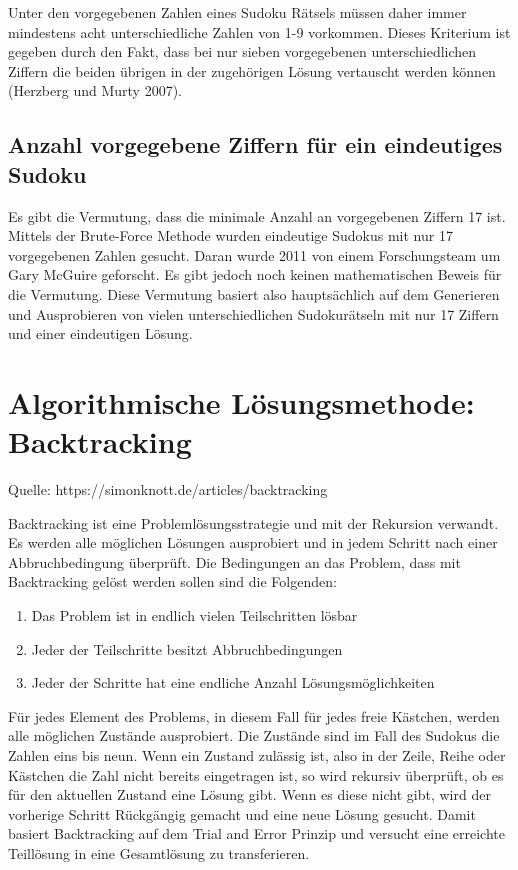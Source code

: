 Unter den vorgegebenen Zahlen eines Sudoku Rätsels müssen daher immer mindestens acht unterschiedliche Zahlen von 1-9 vorkommen. Dieses Kriterium ist gegeben durch den Fakt, dass bei nur sieben vorgegebenen unterschiedlichen Ziffern die beiden übrigen in der zugehörigen Lösung vertauscht werden können (Herzberg und Murty 2007).

\subsection{Anzahl vorgegebene Ziffern für ein eindeutiges Sudoku}  
Es gibt die Vermutung, dass die minimale Anzahl an vorgegebenen Ziffern 17 ist. Mittels der Brute-Force Methode wurden eindeutige Sudokus mit nur 17 vorgegebenen Zahlen gesucht. Daran wurde 2011 von einem Forschungsteam um Gary McGuire geforscht. Es gibt jedoch noch keinen mathematischen Beweis für die Vermutung. Diese Vermutung basiert also hauptsächlich auf dem Generieren und Ausprobieren von vielen unterschiedlichen Sudokurätseln mit nur 17 Ziffern und einer eindeutigen Lösung. 

\section{Algorithmische Lösungsmethode: Backtracking}
Quelle: https://simonknott.de/articles/backtracking

Backtracking ist eine Problemlösungsstrategie und mit der Rekursion verwandt. Es werden alle möglichen Lösungen ausprobiert und in jedem Schritt nach einer Abbruchbedingung überprüft. Die Bedingungen an das Problem, dass mit Backtracking gelöst werden sollen sind die Folgenden: 
\begin{enumerate}
	\item Das Problem ist in endlich vielen Teilschritten lösbar
	\item Jeder der Teilschritte besitzt Abbruchbedingungen
	\item Jeder der Schritte hat eine endliche Anzahl Lösungsmöglichkeiten
\end{enumerate}

Für jedes Element des Problems, in diesem Fall für jedes freie Kästchen, werden alle möglichen Zustände ausprobiert. Die Zustände sind im Fall des Sudokus die Zahlen eins bis neun. Wenn ein Zustand zulässig ist, also in der Zeile, Reihe oder Kästchen die Zahl nicht bereits eingetragen ist, so wird rekursiv überprüft, ob es für den aktuellen Zustand eine Lösung gibt. Wenn es diese nicht gibt, wird der vorherige Schritt Rückgängig gemacht und eine neue Lösung gesucht. 
Damit basiert Backtracking auf dem Trial and Error Prinzip und versucht eine erreichte Teillösung in eine Gesamtlösung zu transferieren. 


